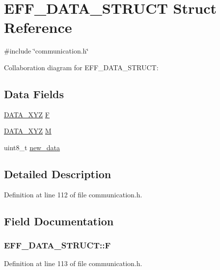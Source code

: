\hypertarget{structEFF__DATA__STRUCT}{
\section{EFF\_\-DATA\_\-STRUCT Struct Reference}
\label{structEFF__DATA__STRUCT}
}


{\ttfamily \#include \char`\"{}communication.h\char`\"{}}



Collaboration diagram for EFF\_\-DATA\_\-STRUCT:\subsection*{Data Fields}
\begin{DoxyCompactItemize}
\item 
\hyperlink{structDATA__XYZ}{DATA\_\-XYZ} \hyperlink{structEFF__DATA__STRUCT_abe8952947b54bf9c247f3429ee3aeb44}{F}
\item 
\hyperlink{structDATA__XYZ}{DATA\_\-XYZ} \hyperlink{structEFF__DATA__STRUCT_aaf6e03b6e600295e0f5c706fc869e9d1}{M}
\item 
uint8\_\-t \hyperlink{structEFF__DATA__STRUCT_aa42ebc512dd79fa6ebf998162a149446}{new\_\-data}
\end{DoxyCompactItemize}


\subsection{Detailed Description}


Definition at line 112 of file communication.h.



\subsection{Field Documentation}
\hypertarget{structEFF__DATA__STRUCT_abe8952947b54bf9c247f3429ee3aeb44}{
\subsubsection[{F}]{ {\bf EFF\_\-DATA\_\-STRUCT::F}}}
\label{structEFF__DATA__STRUCT_abe8952947b54bf9c247f3429ee3aeb44}


Definition at line 113 of file communication.h.



